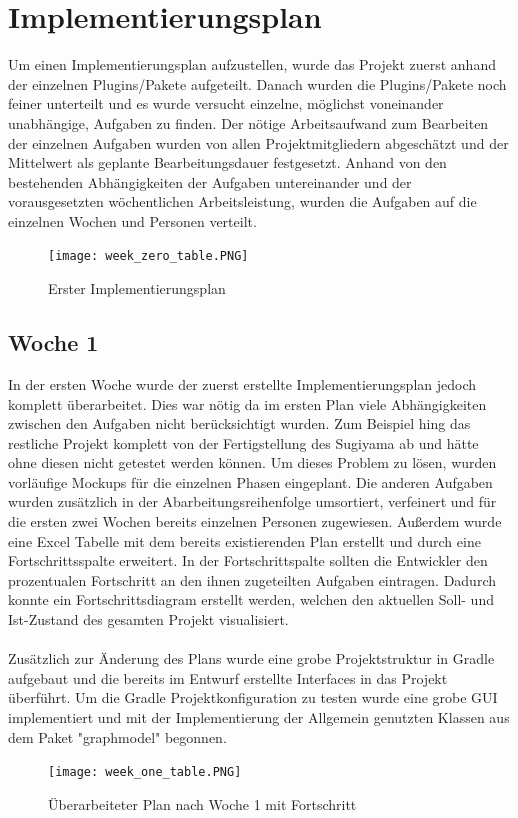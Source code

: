 \chapter{Implementierungsplan}
\label{ch:implplan}
Um einen Implementierungsplan aufzustellen, wurde das Projekt zuerst anhand der einzelnen Plugins/Pakete aufgeteilt. Danach wurden die Plugins/Pakete noch feiner unterteilt und es wurde versucht einzelne, möglichst voneinander unabhängige, Aufgaben zu finden. Der nötige Arbeitsaufwand zum Bearbeiten der einzelnen Aufgaben wurden von allen Projektmitgliedern abgeschätzt und der Mittelwert als geplante Bearbeitungsdauer festgesetzt. Anhand von den bestehenden Abhängigkeiten der Aufgaben untereinander und der vorausgesetzten wöchentlichen Arbeitsleistung, wurden die Aufgaben auf die einzelnen Wochen und Personen verteilt. \\
\begin{figure}[!htbp]
	\centering
	\texttt{[image: week\_zero\_table.PNG]}
	\caption{Erster Implementierungsplan}
	\label{fig:week_zero_table}
\end{figure}

\newpage

\section{Woche 1}
In der ersten Woche wurde der zuerst erstellte Implementierungsplan jedoch komplett überarbeitet. Dies war nötig da im ersten Plan viele Abhängigkeiten zwischen den Aufgaben nicht berücksichtigt wurden. Zum Beispiel hing das restliche Projekt komplett von der Fertigstellung des Sugiyama ab und hätte ohne diesen nicht getestet werden können. Um dieses Problem zu lösen, wurden vorläufige Mockups für die einzelnen Phasen eingeplant. Die anderen Aufgaben wurden zusätzlich in der Abarbeitungsreihenfolge umsortiert, verfeinert und für die ersten zwei Wochen bereits einzelnen Personen zugewiesen. Außerdem wurde eine Excel Tabelle mit dem bereits existierenden Plan erstellt und durch eine Fortschrittsspalte erweitert. In der Fortschrittspalte sollten die Entwickler den prozentualen Fortschritt an den ihnen zugeteilten Aufgaben eintragen. Dadurch konnte ein Fortschrittsdiagram erstellt werden, welchen den aktuellen Soll- und Ist-Zustand des gesamten Projekt visualisiert.\\
\\
Zusätzlich zur Änderung des Plans wurde eine grobe Projektstruktur in Gradle aufgebaut und die bereits im Entwurf erstellte Interfaces in das Projekt überführt. Um die Gradle Projektkonfiguration zu testen wurde eine grobe GUI implementiert und mit der Implementierung der Allgemein genutzten Klassen aus dem Paket "graphmodel"  begonnen.
\begin{figure}[!htbp]
	\centering
	\texttt{[image: week\_one\_table.PNG]}
	\caption{Überarbeiteter Plan nach Woche 1 mit Fortschritt}
	\label{fig:week_one_table}
\end{figure}
